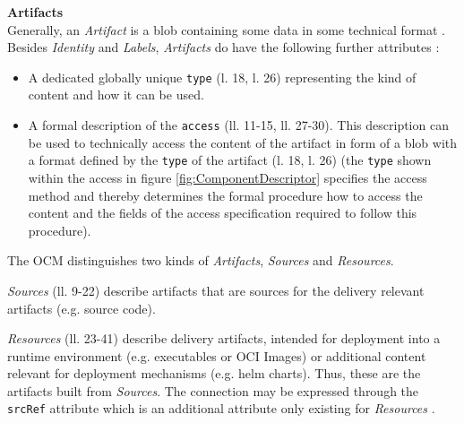 \noindent\textbf{Artifacts}\\
Generally, an \emph{Artifact} is a blob containing some data in some technical format \cite{OCMSpec}. Besides \emph{Identity} and \emph{Labels}, \emph{Artifacts} do have the following further attributes \cite{OCMSpec}:
\begin{itemize}
\item A dedicated globally unique \lstinline|type| (l. 18, l. 26) representing the kind of content and how it can be used.
\item A formal description of the \lstinline|access| (ll. 11-15, ll. 27-30). This description can be used to technically access the content of the artifact in form of a blob with a format defined by the \lstinline|type| of the artifact (l. 18, l. 26) (the \lstinline|type| shown within the access in figure \ref{fig:ComponentDescriptor} specifies the access method and thereby determines the formal procedure how to access the content and the fields of the access specification required to follow this procedure).
\end{itemize}
The OCM distinguishes two kinds of \emph{Artifacts}, \emph{Sources} and \emph{Resources}.\par
\emph{Sources} (ll. 9-22) describe artifacts that are sources for the delivery relevant artifacts (e.g. source code).\par
\emph{Resources} (ll. 23-41) describe delivery artifacts, intended for deployment into a runtime environment (e.g. executables or OCI Images) or additional content relevant for deployment mechanisms (e.g. helm charts). Thus, these are the artifacts built from \emph{Sources}. The connection may be expressed through the \lstinline|srcRef| attribute which is an additional attribute only existing for \emph{Resources} \cite{OCMSpec}.\\

